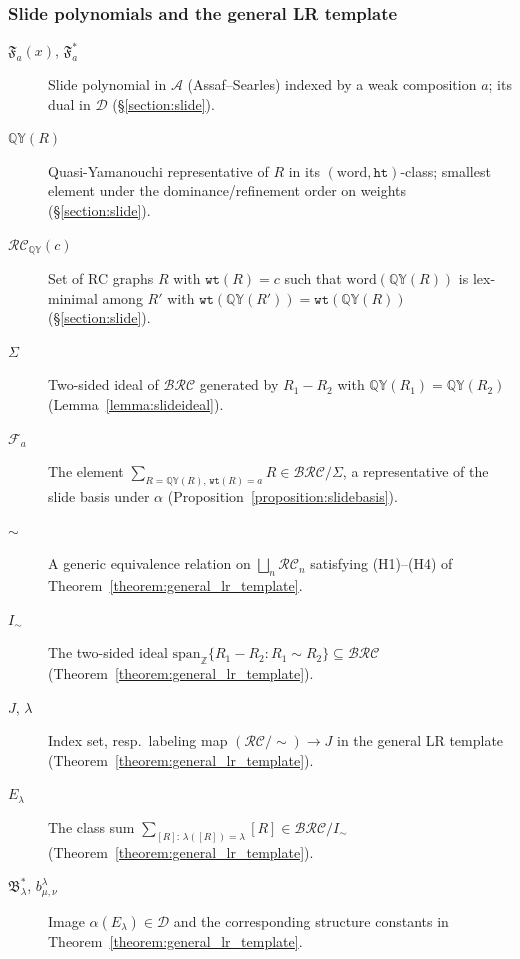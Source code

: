 \documentclass{amsart}
\theoremstyle{definition}
\theoremstyle{remark}
\numberwithin{equation}{subsection}
\newcommand{\wtt}{\mathtt{wt}}
\newcommand{\QY}{\ensuremath{\mathbb{QY}}}
\newcommand{\hr}{\mathtt{ht}}
\newcommand{\BRC}{\mathcal{BRC}}
\newcommand{\RC}{\mathcal{RC}}
\newcommand{\coma}{\mathcal{A}}
\newcommand{\dcoma}{\mathcal{D}}
\begin{document}
\subsubsection*{Slide polynomials and the general LR template}
\begin{description}
\item[$\mathfrak{F}_a(x)$, $\mathfrak{F}_a^*$] Slide polynomial in $\coma$ (Assaf--Searles) indexed by a weak composition $a$; its dual in $\dcoma$ (\S\ref{section:slide}).
\item[$\QY(R)$] Quasi-Yamanouchi representative of $R$ in its $(\mathrm{word},\hr)$-class; smallest element under the dominance/refinement order on weights (\S\ref{section:slide}).
\item[$\RC_\QY(c)$] Set of RC graphs $R$ with $\wtt(R)=c$ such that $\mathrm{word}(\QY(R))$ is lex-minimal among $R'$ with $\wtt(\QY(R'))=\wtt(\QY(R))$ (\S\ref{section:slide}).
\item[$\Sigma$] Two-sided ideal of $\BRC$ generated by $R_1-R_2$ with $\QY(R_1)=\QY(R_2)$ (Lemma~\ref{lemma:slideideal}).
\item[$\mathcal{F}_a$] The element $\sum_{R=\QY(R),\,\wtt(R)=a} R\in\BRC/\Sigma$, a representative of the slide basis under $\alpha$ (Proposition~\ref{proposition:slidebasis}).
\item[$\sim$] A generic equivalence relation on $\bigsqcup_n\RC_n$ satisfying (H1)--(H4) of Theorem~\ref{theorem:general_lr_template}.
\item[$I_\sim$] The two-sided ideal $\mathrm{span}_{\mathbb{Z}}\{R_1-R_2:R_1\sim R_2\}\subseteq\BRC$ (Theorem~\ref{theorem:general_lr_template}).
\item[$J$, $\lambda$] Index set, resp.\ labeling map $(\RC/\!\sim)\to J$ in the general LR template (Theorem~\ref{theorem:general_lr_template}).
\item[$E_\lambda$] The class sum $\sum_{[R]:\,\lambda([R])=\lambda}[R]\in\BRC/I_\sim$ (Theorem~\ref{theorem:general_lr_template}).
\item[$\mathfrak{B}_\lambda^*$, $b_{\mu,\nu}^\lambda$] Image $\alpha(E_\lambda)\in\dcoma$ and the corresponding structure constants in Theorem~\ref{theorem:general_lr_template}.
\end{description}
\end{document}
